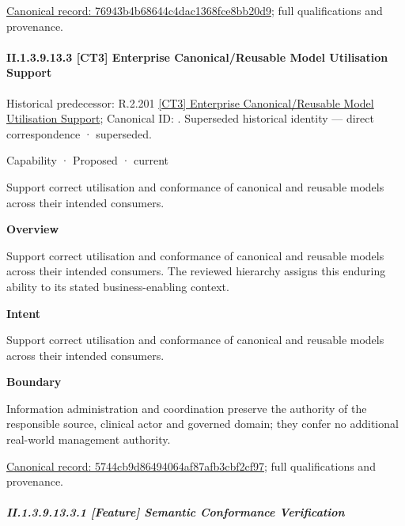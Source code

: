 {\footnotesize \href{../../../../../../../continuum/strategy/capability/76943b4b68644c4dac1368fce8bb20d9.md}{Canonical record: 76943b4b68644c4dac1368fce8bb20d9}; full qualifications and provenance.}\par
\paragraph*{II.1.3.9.13.3 [CT3] Enterprise Canonical/Reusable Model Utilisation Support}
\label{navigation:II.1.3.9.13.3}

{\small Historical predecessor: R.2.201 \hyperref[element:7ae95677a00346f18a0ba01522a20153]{[CT3] Enterprise Canonical/Reusable Model Utilisation Support}; Canonical ID: \texttt{}. Superseded historical identity — direct correspondence · superseded.}\par
\label{element:5744cb9d86494064af87afb3cbf2cf97}
{\small Capability · Proposed · current}\par

Support correct utilisation and conformance of canonical and reusable models across their intended consumers.



\textbf{Overview}



Support correct utilisation and conformance of canonical and reusable models across their intended consumers. The reviewed hierarchy assigns this enduring ability to its stated business-enabling context.



\textbf{Intent}



Support correct utilisation and conformance of canonical and reusable models across their intended consumers.



\textbf{Boundary}



Information administration and coordination preserve the authority of the responsible source, clinical actor and governed domain; they confer no additional real-world management authority.


{\footnotesize \href{../../../../../../../continuum/strategy/capability/5744cb9d86494064af87afb3cbf2cf97.md}{Canonical record: 5744cb9d86494064af87afb3cbf2cf97}; full qualifications and provenance.}\par
\subparagraph*{II.1.3.9.13.3.1 [Feature] Semantic Conformance Verification}
\label{navigation:II.1.3.9.13.3.1}

